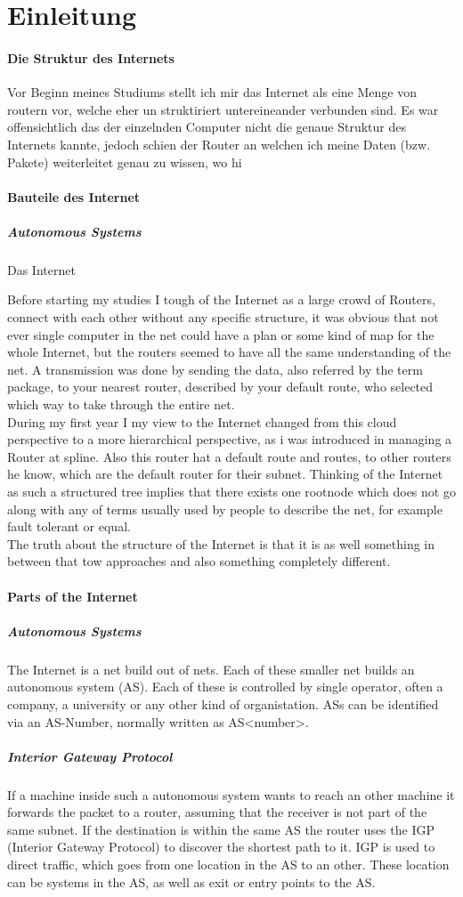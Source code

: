 \section{Einleitung}
\paragraph{Die Struktur des Internets}
Vor Beginn meines Studiums stellt ich mir das Internet als eine Menge 
von routern vor, welche eher un struktiriert untereineander verbunden 
sind. Es war offensichtlich das der einzelnden Computer nicht die 
genaue Struktur des Internets kannte, jedoch schien der Router an 
welchen ich meine Daten (bzw. Pakete) weiterleitet genau zu wissen, wo 
hi 
\paragraph{Bauteile des Internet}
\subparagraph{Autonomous Systems}
Das Internet 


Before starting my studies I tough of the Internet as a large crowd of 
Routers, connect with each other without any specific structure, it was 
obvious that not ever single computer in the net could have a plan or 
some kind of map for the whole Internet, but the routers seemed to have 
all the same understanding of the net. A transmission was done by 
sending the data, also referred by the term package, to your nearest 
router, described by your default route, who selected which way to take 
through the entire net. \\
During my first year I my view to the Internet changed from this 
cloud perspective to a more hierarchical perspective, as i was introduced 
in managing a Router at spline. Also this router hat a default route 
and routes, to other routers he know, which are the default router for 
their subnet. Thinking of the Internet as such a structured tree 
implies that there exists one rootnode which does not go along with any 
of terms usually used by people to describe the net, for example 
fault tolerant or equal. \\
The truth about the structure of the Internet is that it is as well 
something in between that tow approaches and also something completely 
different. 
\paragraph{Parts of the Internet}
\subparagraph{Autonomous Systems}
The Internet is a net build out of nets. Each of these smaller net 
builds an autonomous system (AS). Each of these is controlled by single 
operator, often a company, a university or any other kind of 
organistation. ASs can be identified via an AS-Number, normally written 
as AS<number>.
\subparagraph{Interior Gateway Protocol}
If a machine inside such a autonomous system wants to reach an other 
machine it forwards the packet to a router, assuming that the receiver 
is not part of the same subnet. If the destination is within the same AS 
the router uses the IGP (Interior Gateway Protocol) to discover the 
shortest path to it. IGP is used to direct traffic, which goes from 
one location in the AS to an other. These location can be systems in 
the AS, as well as exit or entry points to the AS.
